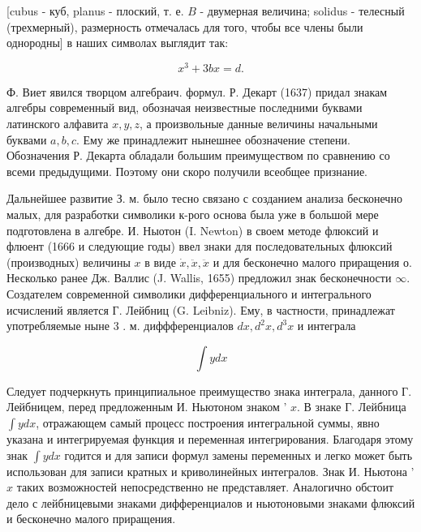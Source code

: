 \documentclass[10pt]{article}
\begin{document}
[cubus - куб, planus - плоский, т. е. $B$ - двумерная величина; solidus - телесный (трехмерный), размерность отмечалась для того, чтобы все члены были однородны] в наших символах выглядит так:



\[

x^{3}+3 b x=d .

\]



Ф. Виет явился творцом алгебраич. формул. Р. Декарт (1637) придал знакам алгебры современный вид, обозначая неизвестные последними буквами латинского алфавита $x, y, z$, а произвольные данные величины начальными буквами $a, b, c$. Ему же принадлежит нынешнее обозначение степени. Обозначения Р. Декарта обладали большим преимуществом по сравнению со всеми предыдущими. Поэтому они скоро получили всеобщее признание.



Дальнейшее развитие З. м. было тесно связано с созданием анализа бесконечно малых, для разработки символики к-рого основа была уже в большой мере подготовлена в алгебре. И. Ныотон (I. Newton) в своем методе флюксий и флюент (1666 и следующие годы) ввел знаки для последовательных флюксий (производных) величины $x$ в виде $\dot{x}, \ddot{x}, \ddot{x}$ и для бесконечно малого приращения о. Несколько ранее Дж. Валлис (J. Wallis, 1655) предложил знак бесконечности $\infty$. Создателем современной символики дифференциального и интегрального исчислений является Г. Лейбниц (G. Leibniz). Ему, в частности, принадлежат употребляемые ныне 3 . м. диффференциалов $d x, d^{2} x, d^{3} x$ и интеграла



\[

\int y d x

\]



Следует подчеркнуть принципиальное преимущество знака интеграла, данного Г. Лейбницем, перед предложенным И. Ньютоном знаком ' $x$. В знаке Г. Лейбница $\int y d x$, отражающем самый процесс построения интегральной суммы, явно указана и интегрируемая функция и переменная интегрирования. Благодаря этому знак $\int y d x$ годится и для записи формул замены переменных и легко может быть использован для записи кратных и криволинейных интегралов. Знак И. Ньютона ' $x$ таких возможностей непосредственно не представляет. Аналогично обстоит дело с лейбницевыми знаками дифференциалов и ньютоновыми знаками флюксий и бесконечно малого приращения.
\end{document}
